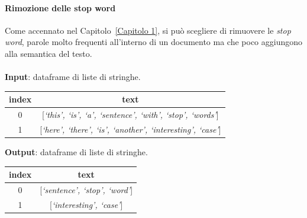 \documentclass[12pt]{report}
\theoremstyle{definition}
\begin{document}
\paragraph{Rimozione delle stop word}
Come accennato nel Capitolo~\ref{Capitolo 1}, si può scegliere di rimuovere le \textit{stop word}, parole molto frequenti all'interno di un documento ma che poco aggiungono alla semantica del testo.
\\
\\
\textbf{Input}: dataframe di liste di stringhe.
\begin{center}
    \begin{tabular}{|c|c|}
    \hline
    \textbf{index} & \textbf{text} \\
    \hline
         0 & [\textit{`this', `is', `a', `sentence', `with', `stop', `words'}]\\
         1 & [\textit{`here', `there', `is', `another', `interesting', `case'}]\\
    \hline
    \end{tabular}
\end{center}
\textbf{Output}: dataframe di liste di stringhe.
\begin{center}
    \begin{tabular}{|c|c|}
    \hline
    \textbf{index} & \textbf{text} \\
    \hline
         0 & [\textit{`sentence', `stop', `word'}]\\
         1 & [\textit{`interesting', `case'}]\\
    \hline
    \end{tabular}
\end{center}
\end{document}
